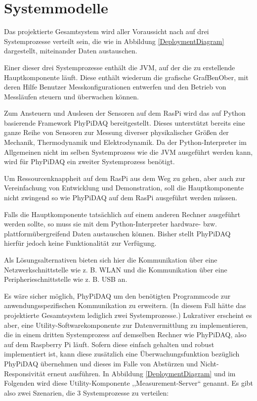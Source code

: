 \documentclass[parskip=full]{scrartcl}
\begin{document}
\clearpage
\section{Systemmodelle}\label{systemmodell}

Das projektierte Gesamtsystem wird aller Voraussicht nach auf drei Systemprozesse verteilt sein, die wie in Abbildung \ref{DeploymentDiagram} dargestellt, miteinander Daten austauschen.

Einer dieser drei Systemprozesse enthält die \gls{JVM}, auf der die zu erstellende Hauptkomponente läuft. Diese enthält wiederum die grafische \gls{GrafBenOber}, mit deren Hilfe Benutzer Messkonfigurationen entwerfen und den Betrieb von Messläufen steuern und überwachen können.

Zum Ansteuern und Auslesen der Sensoren auf dem \gls{RasPi} wird das auf Python basierende Framework \gls{PhyPiDAQ} bereitgestellt. Dieses unterstützt bereits eine  ganze Reihe von Sensoren zur Messung diverser physikalischer Größen der Mechanik, Thermodynamik und Elektrodynamik. Da der Python-Interpreter im Allgemeinen nicht im selben Systemprozess wie die \gls{JVM} ausgeführt werden kann, wird für PhyPiDAQ ein zweiter Systemprozess benötigt.

Um Ressourcenknappheit auf dem \gls{RasPi} aus dem Weg zu gehen, aber auch zur Vereinfachung von Entwicklung und Demonstration, soll die Hauptkomponente nicht zwingend so wie PhyPiDAQ auf dem \gls{RasPi} ausgeführt werden müssen. 

Falls die Hauptkomponente tatsächlich auf einem anderen Rechner ausgeführt werden sollte, so muss sie mit dem Python-Interpreter hardware- bzw. plattformübergreifend Daten austauschen können. Bisher stellt PhyPiDAQ hierfür jedoch keine Funktionalität zur Verfügung. 

Als Lösungsalternativen bieten sich hier die Kommunikation über eine Netzwerkschnittstelle wie z. B. WLAN und die Kommunikation über eine Peripherieschnittstelle wie z. B. USB an.

Es wäre sicher möglich, PhyPiDAQ um den benötigten Programmcode zur anwendungsspezifischen Kommunikation zu erweitern. (In diesem Fall hätte das projektierte Gesamtsystem lediglich zwei Systemprozesse.) Lukrativer erscheint es aber, eine Utility-Softwarekomponente zur Datenvermittlung zu implementieren, die in einem dritten Systemprozess auf demselben Rechner wie PhyPiDAQ, also auf dem Raspberry Pi läuft. Sofern diese einfach gehalten und robust implementiert ist, kann diese zusätzlich eine Überwachungsfunktion bezüglich PhyPiDAQ übernehmen und dieses im Falle von Abstürzen und Nicht-Responsivität erneut ausführen. In Abbildung \ref{DeploymentDiagram} und im Folgenden wird diese Utility-Komponente ,,Measurement-Server`` genannt.
\newpage
Es gibt also zwei Szenarien, die 3 Systemprozesse zu verteilen: 
\end{document}
